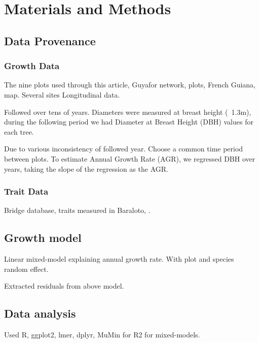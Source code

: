 \section*{Materials and Methods}
\label{sec:M&M}

\subsection*{Data Provenance}

\subsubsection*{Growth Data}
The nine plots used through this article,
Guyafor network, plots,
French Guiana, map. Several sites
Longitudinal data.

Followed over tens of years. Diameters were measured at breast height (~1.3m), during the following period we had Diameter at Breast Height (DBH) values for each tree.

Due to various inconsistency of followed year. Choose a common time period between plots. To estimate Annual Growth Rate (AGR), we regressed DBH over years, taking the slope of the regression as the AGR.

\subsubsection*{Trait Data}

Bridge database, traits measured in Baraloto, \citep{baraloto_functional_2010, baraloto_decoupled_2010}.

\subsection*{Growth model}

Linear mixed-model explaining annual growth rate. With plot and species random effect.

Extracted residuals from above model.

\subsection*{Data analysis}

Used R, ggplot2, lmer, dplyr, MuMin for R2 for mixed-models.